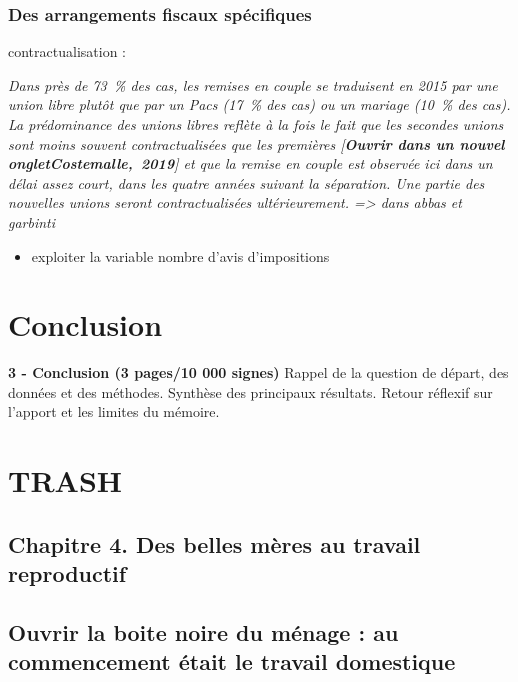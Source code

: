 \documentclass[
  12pt,
]{book}
\providecommand{\tightlist}{%
  \setlength{\itemsep}{0pt}\setlength{\parskip}{0pt}}
\begin{document}
\subsection{Des arrangements fiscaux
spécifiques}\label{des-arrangements-fiscaux-spuxe9cifiques}

contractualisation :

\emph{Dans près de 73~\% des cas, les remises en couple se traduisent en
2015 par une union libre plutôt que par un Pacs (17~\% des cas) ou un
mariage (10~\% des cas). La prédominance des unions libres reflète à la
fois le fait que les secondes unions sont moins souvent contractualisées
que les premières {[}\textbf{Ouvrir dans un nouvel
ongletCostemalle,~2019}{]} et que la remise en couple est observée ici
dans un délai assez court, dans les quatre années suivant la séparation.
Une partie des nouvelles unions seront contractualisées ultérieurement.
=\textgreater{} dans abbas et garbinti}

\begin{itemize}
\tightlist
\item
  exploiter la variable nombre d'avis d'impositions
\end{itemize}

\chapter{Conclusion}\label{conclusion}

\textbf{3 - Conclusion (3 pages/10 000 signes)} Rappel de la question de
départ, des données et des méthodes. Synthèse des principaux résultats.
Retour réflexif sur l'apport et les limites du mémoire.

\chapter{TRASH}\label{trash}

\section{Chapitre 4. Des belles mères au travail
reproductif}\label{chapitre-4.-des-belles-muxe8res-au-travail-reproductif}

\section{Ouvrir la boite noire du ménage : au commencement était le
travail
domestique}\label{ouvrir-la-boite-noire-du-muxe9nage-au-commencement-uxe9tait-le-travail-domestique}
\end{document}
